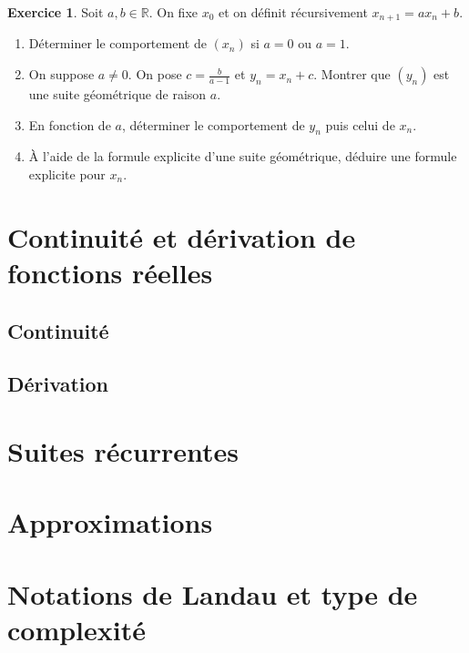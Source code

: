 \documentclass[
]{book}
\providecommand{\tightlist}{%
  \setlength{\itemsep}{0pt}\setlength{\parskip}{0pt}}
\theoremstyle{definition}
\theoremstyle{definition}
\theoremstyle{definition}
\newtheorem{exercise}{Exercice}[chapter]
\theoremstyle{definition}
\theoremstyle{remark}
\begin{document}
\begin{exercise}

Soit \(a,b\in \mathbb{R}\). On fixe \(x_0\) et on définit récursivement \(x_{n+1}=ax_n+b\).

\begin{enumerate}
\def\labelenumi{\arabic{enumi}.}
\tightlist
\item
  Déterminer le comportement de \((x_n)\) si \(a=0\) ou \(a=1\).
\item
  On suppose \(a\neq0\). On pose \(c=\frac{b}{a-1}\) et \(y_n=x_n+c\). Montrer que \((y_n)\) est une suite géométrique de raison \(a\).
\item
  En fonction de \(a\), déterminer le comportement de \(y_n\) puis celui de \(x_n\).
\item
  À l'aide de la formule explicite d'une suite géométrique, déduire une formule explicite pour \(x_n\).
\end{enumerate}

\end{exercise}

\hypertarget{continuituxe9-et-duxe9rivation-de-fonctions-ruxe9elles}{%
\chapter{Continuité et dérivation de fonctions réelles}\label{continuituxe9-et-duxe9rivation-de-fonctions-ruxe9elles}}

\hypertarget{continuituxe9}{%
\section{Continuité}\label{continuituxe9}}

\hypertarget{duxe9rivation}{%
\section{Dérivation}\label{duxe9rivation}}

\hypertarget{suites-ruxe9currentes}{%
\chapter{Suites récurrentes}\label{suites-ruxe9currentes}}

\hypertarget{approximations}{%
\chapter{Approximations}\label{approximations}}

\hypertarget{notations-de-landau-et-type-de-complexituxe9}{%
\chapter{Notations de Landau et type de complexité}\label{notations-de-landau-et-type-de-complexituxe9}}

  
\end{document}
